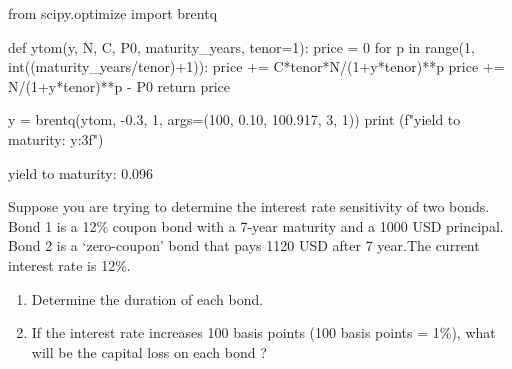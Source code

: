 \cprotEnv\begin{solution}
\begin{ipython}
from scipy.optimize import brentq

def ytom(y, N, C, P0, maturity_years, tenor=1): 
    price = 0
    for p in range(1, int((maturity_years/tenor)+1)):
        price += C*tenor*N/(1+y*tenor)**p
    price += N/(1+y*tenor)**p - P0 
    return price

y = brentq(ytom, -0.3, 1, args=(100, 0.10, 100.917, 3, 1))
print (f"yield to maturity: {y:3f}")
\end{ipython}
\begin{ioutput}
yield to maturity: 0.096
\end{ioutput}    
\end{solution}

\begin{question}
Suppose you are trying to determine the interest rate sensitivity of two bonds. Bond 1 is a 12\% coupon bond with a 7-year maturity and a 1000 USD principal. Bond 2 is a ‘zero-coupon’ bond that pays 1120 USD after 7 year.The current interest rate is 12\%.
\begin{enumerate}
\item Determine the duration of each bond.
\item If the interest rate increases 100 basis points (100 basis points = 1\%), what will be the capital loss on each bond ?
\end{enumerate}
\end{question}

